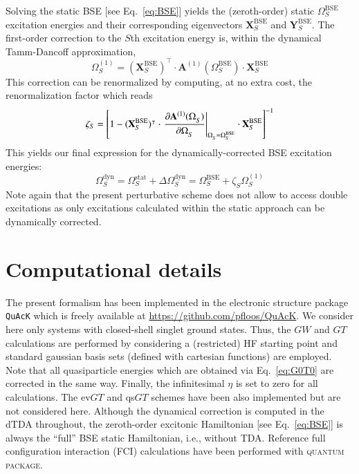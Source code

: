\documentclass[aip,jcp,reprint,noshowkeys,superscriptaddress]{revtex4-1}
\newcommand{\QP}{\textsc{quantum package}}
\newcommand{\T}[1]{#1^{\intercal}}
\newcommand{\BSE}{\text{BSE}}
\newcommand{\Om}[2]{\Omega_{#1}^{#2}}
\newcommand{\bA}[2]{\mathbf{A}_{#1}^{#2}}
\newcommand{\bX}[2]{\mathbf{X}_{#1}^{#2}}
\newcommand{\bY}[2]{\mathbf{Y}_{#1}^{#2}}
\begin{document}
Solving the static BSE [see Eq.~\eqref{eq:BSE}] yields the (zeroth-order) static $\Om{S}{\BSE}$ excitation energies and their corresponding eigenvectors $\bX{S}{\BSE}$ and $\bY{S}{\BSE}$. 
The first-order correction to the $S$th excitation energy is, within the dynamical Tamm-Dancoff approximation,
\begin{equation}
\label{eq:Om1-TDA}
	\Om{S}{(1)} = \T{(\bX{S}{\BSE})} \cdot \bA{}{(1)}(\Om{S}{\BSE}) \cdot \bX{S}{\BSE}
\end{equation}
This correction can be renormalized by computing, at no extra cost, the renormalization factor which reads
\begin{equation}
\label{eq:Z}
	\zeta_{S} = \qty[ 1 - \T{(\bX{S}{\BSE})} \cdot \left. \pdv{\bA{}{(1)}(\Om{S}{})}{\Om{S}{}} \right|_{\Om{S}{} = \Om{S}{\BSE}} \cdot \bX{S}{\BSE} ]^{-1}
\end{equation}
This yields our final expression for the dynamically-corrected BSE excitation energies:
\begin{equation}
	\Om{S}{\text{dyn}} = \Om{S}{\text{stat}} + \Delta\Om{S}{\text{dyn}} = \Om{S}{\BSE} + \zeta_{S} \Om{S}{(1)}
\end{equation}
Note again that the present perturbative scheme does not allow to access double excitations as only excitations calculated within the static approach can be dynamically corrected.

\section{Computational details}
\label{sec:compdet}
The present formalism has been implemented in the electronic structure package \texttt{QuAcK} \cite{QuAcK} which is freely available at \url{https://github.com/pfloos/QuAcK}. 
We consider here only systems with closed-shell singlet ground states. 
Thus, the $GW$ and $GT$ calculations are performed by considering a (restricted) HF starting point and standard gaussian basis sets (defined with cartesian functions) are employed.
Note that all quasiparticle energies which are obtained via Eq.~\eqref{eq:G0T0} are corrected in the same way.
Finally, the infinitesimal $\eta$ is set to zero for all calculations.
The ev$GT$ and qs$GT$ schemes have been also implemented but are not considered here.
Although the dynamical correction is computed in the dTDA throughout, the zeroth-order excitonic Hamiltonian [see Eq.~\eqref{eq:BSE}] is always the ``full'' BSE static Hamiltonian, i.e., without TDA. 
Reference full configuration interaction (FCI) calculations have been performed with {\QP}. \cite{Garniron_2019}
\end{document}
